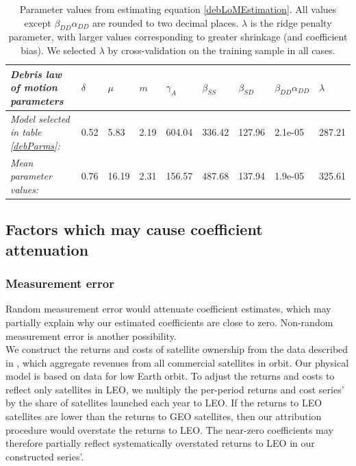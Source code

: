 \documentclass[12pt]{article}
\begin{document}
\begin{table}[H]
	\begin{tabular}{|l|l|l|l|l|l|l|l|l|}
		\hline
		\textit{Debris law of motion parameters} & \textbf{$\delta$} & \textbf{$\mu$} & \textbf{$m$} & \textbf{$\gamma_A$} & \textbf{$\beta_{SS}$} & \textbf{$\beta_{SD}$} & \textbf{$\beta_{DD}\alpha_{DD}$} & $\lambda$ \\ \hline
		\textit{Model selected in table \ref{debParms}:}                           & 0.52              & 5.83           & 2.19         & 604.04              & 336.42                & 127.96                & 2.1e-05  &    287.21                     \\ \hline
		\textit{Mean parameter values:}                           & 0.76              & 16.19           & 2.31         & 156.57              &  487.68                & 137.94                & 1.9e-05      &  325.61                  \\ \hline
	\end{tabular}
	\caption{Parameter values from estimating equation \ref{debLoMEstimation}. All values except $\beta_{DD}\alpha_{DD}$ are rounded to two decimal places. $\lambda$ is the ridge penalty parameter, with larger values corresponding to greater shrinkage (and coefficient bias). We selected $\lambda$ by cross-validation on the training sample in all cases.}
	\label{debSensitivityCoefs}
\end{table}


\subsection{Factors which may cause coefficient attenuation}
\label{attenuationFactors}
\subsubsection*{Measurement error}

Random measurement error would attenuate coefficient estimates, which may partially explain why our estimated coefficients are close to zero. Non-random measurement error is another possibility. \\

We construct the returns and costs of satellite ownership from the data described in \citet{wienzierl2018}, which aggregate revenues from all commercial satellites in orbit. Our physical model is based on data for low Earth orbit. To adjust the returns and costs to reflect only satellites in LEO, we multiply the per-period returns and cost series' by the share of satellites launched each year to LEO. If the returns to LEO satellites are lower than the returns to GEO satellites, then our attribution procedure would overstate the returns to LEO. The near-zero coefficients may therefore partially reflect systematically overstated returns to LEO in our constructed series'.
\end{document}

